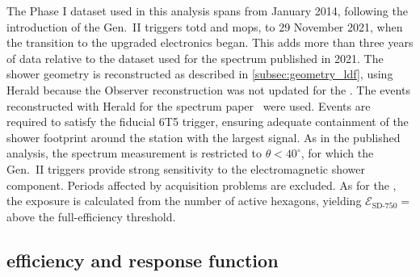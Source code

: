 \documentclass[main.tex]{subfiles}
\begin{document}
The  Phase I dataset used in this analysis spans from January 2014, following the introduction of the Gen.~II triggers \gls{totd} and \gls{mops}, to 29 November 2021, when the transition to the upgraded electronics began.
This adds more than three years of data relative to the dataset used for the spectrum published in 2021.
The shower geometry is reconstructed as described in \cref{subsec:geometry_ldf}, using Herald because the Observer reconstruction was not updated for the .
The events reconstructed with Herald for the  spectrum paper~\cite{PierreAuger:2021:InfillSpectrum} were used.
Events are required to satisfy the fiducial 6T5 trigger, ensuring adequate containment of the shower footprint around the station with the largest signal.
As in the published analysis, the spectrum measurement is restricted to $\theta<40^\circ$, for which the Gen.~II triggers provide strong sensitivity to the electromagnetic shower component.
Periods affected by acquisition problems are excluded.
As for the , the exposure is calculated from the number of active hexagons, yielding $\mathcal{E}_{\text{SD-750}}=$\SDSevenFiftyExposure above the full-efficiency threshold.

\subsection{ efficiency and response function}
\label{subsec:sd750_efficiency}
\end{document}
